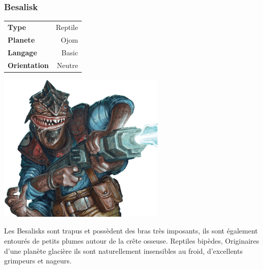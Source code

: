 \subsubsection{Besalisk}

\begin{samepage}
    \vspace{-2\baselineskip}
    \begin{flushright}	
        \begin{tabular}{|l|r|}
            \textbf{Type}        & Reptile \\
            \textbf{Planete}     & Ojom \\
            \textbf{Langage}     & Basic \\
            \textbf{Orientation} & Neutre\\
        \end{tabular}
    \end{flushright}
    \vspace{-3\baselineskip}
    \includegraphics[width=8cm]{img/personnages/races/besalisk.png}
\end{samepage}
 
Les Besalisks sont trapus et possèdent des bras très imposants, ils sont également entourés de petits plumes autour de la crête osseuse. Reptiles bipèdes, Originaires d’une planète glacière ils sont naturellement insensibles au froid, d’excellents grimpeurs et nageurs.

